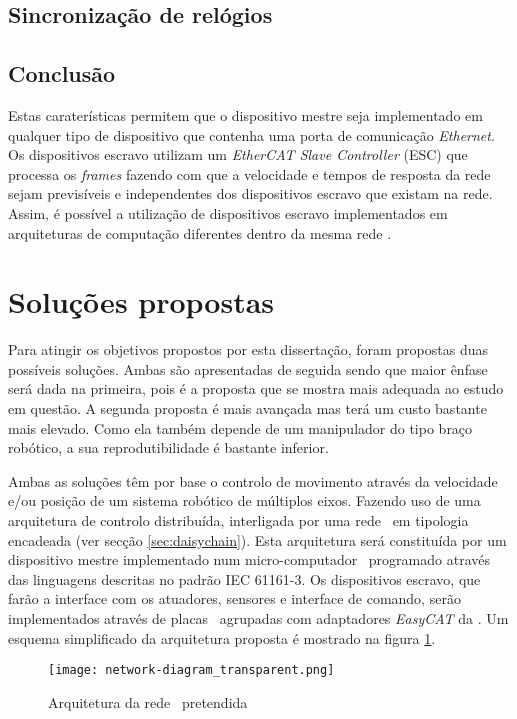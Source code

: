 \subsection{Sincronização de relógios}

\subsection{Conclusão}
Estas caraterísticas permitem que o dispositivo mestre seja implementado
em qualquer tipo de dispositivo que contenha uma porta de comunicação 
\emph{Ethernet}. Os dispositivos escravo utilizam um \emph{EtherCAT Slave
Controller} (ESC) que processa os \emph{frames} fazendo com que a velocidade
e tempos de resposta da rede sejam previsíveis e independentes dos 
dispositivos escravo que existam na rede. Assim, é possível a utilização
de dispositivos escravo implementados em arquiteturas de computação
diferentes dentro da mesma rede \ecat.


\section{Soluções propostas} \label{sec:solution}

Para atingir os objetivos propostos por esta dissertação, foram propostas 
duas possíveis soluções. Ambas são apresentadas de seguida sendo que
maior ênfase será dada na primeira, pois é a proposta que se mostra mais
adequada ao estudo em questão. A segunda proposta é mais avançada mas
terá um custo bastante mais elevado. Como ela também depende de um manipulador
do tipo braço robótico, a sua reprodutibilidade é bastante inferior.

Ambas as soluções têm por base o controlo de movimento através da velocidade
e/ou posição de um sistema robótico de múltiplos eixos. Fazendo uso de
uma arquitetura de controlo distribuída, interligada por uma rede \ecat\
em tipologia encadeada (ver secção \ref{sec:daisychain}). Esta arquitetura
será constituída por um dispositivo mestre implementado num micro-computador
\raspi\, programado através das linguagens descritas no padrão
IEC 61161-3. Os dispositivos escravo, que farão a interface com os atuadores,
sensores e interface de comando, serão implementados através de placas
\arduino\ agrupadas com adaptadores \emph{EasyCAT} da \cite{ABT:EasyCAT}.
Um esquema simplificado da arquitetura proposta é mostrado na figura
\ref{fig:network-architecture}.

\begin{figure}[htb]
 \centering
 \texttt{[image: network-diagram\_transparent.png]}
 \caption{Arquitetura da rede \ecat\ pretendida}
 \label{fig:network-architecture}
\end{figure}



